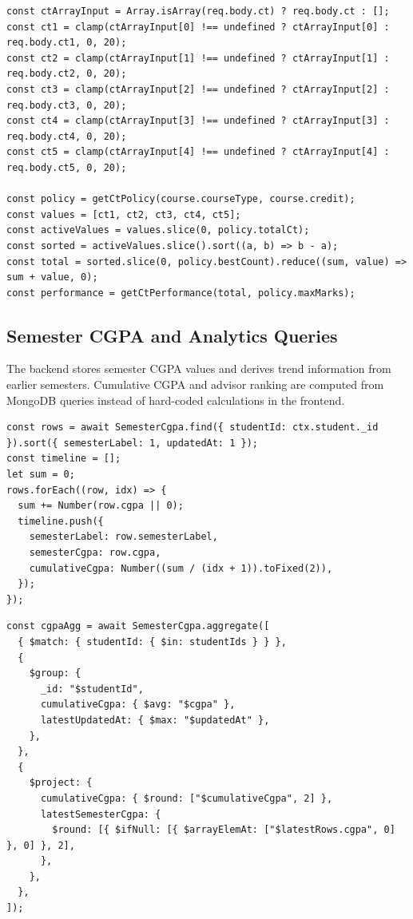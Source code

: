 \documentclass[12pt,a4paper]{article}
\begin{document}
\begin{lstlisting}
const ctArrayInput = Array.isArray(req.body.ct) ? req.body.ct : [];
const ct1 = clamp(ctArrayInput[0] !== undefined ? ctArrayInput[0] : req.body.ct1, 0, 20);
const ct2 = clamp(ctArrayInput[1] !== undefined ? ctArrayInput[1] : req.body.ct2, 0, 20);
const ct3 = clamp(ctArrayInput[2] !== undefined ? ctArrayInput[2] : req.body.ct3, 0, 20);
const ct4 = clamp(ctArrayInput[3] !== undefined ? ctArrayInput[3] : req.body.ct4, 0, 20);
const ct5 = clamp(ctArrayInput[4] !== undefined ? ctArrayInput[4] : req.body.ct5, 0, 20);

const policy = getCtPolicy(course.courseType, course.credit);
const values = [ct1, ct2, ct3, ct4, ct5];
const activeValues = values.slice(0, policy.totalCt);
const sorted = activeValues.slice().sort((a, b) => b - a);
const total = sorted.slice(0, policy.bestCount).reduce((sum, value) => sum + value, 0);
const performance = getCtPerformance(total, policy.maxMarks);
\end{lstlisting}

\subsection{Semester CGPA and Analytics Queries}
The backend stores semester CGPA values and derives trend information from earlier semesters. Cumulative CGPA and advisor ranking are computed from MongoDB queries instead of hard-coded calculations in the frontend.

\begin{lstlisting}
const rows = await SemesterCgpa.find({ studentId: ctx.student._id }).sort({ semesterLabel: 1, updatedAt: 1 });
const timeline = [];
let sum = 0;
rows.forEach((row, idx) => {
  sum += Number(row.cgpa || 0);
  timeline.push({
    semesterLabel: row.semesterLabel,
    semesterCgpa: row.cgpa,
    cumulativeCgpa: Number((sum / (idx + 1)).toFixed(2)),
  });
});
\end{lstlisting}

\begin{lstlisting}
const cgpaAgg = await SemesterCgpa.aggregate([
  { $match: { studentId: { $in: studentIds } } },
  {
    $group: {
      _id: "$studentId",
      cumulativeCgpa: { $avg: "$cgpa" },
      latestUpdatedAt: { $max: "$updatedAt" },
    },
  },
  {
    $project: {
      cumulativeCgpa: { $round: ["$cumulativeCgpa", 2] },
      latestSemesterCgpa: {
        $round: [{ $ifNull: [{ $arrayElemAt: ["$latestRows.cgpa", 0] }, 0] }, 2],
      },
    },
  },
]);
\end{lstlisting}
\end{document}

